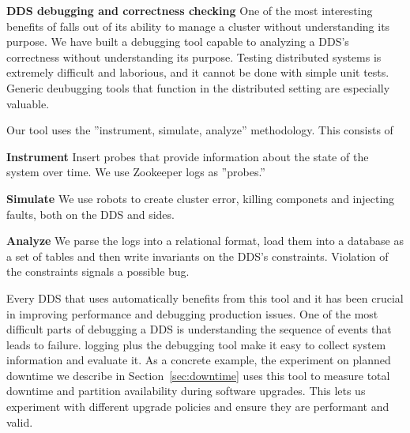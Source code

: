 \textbf{DDS debugging and correctness checking}
%
One of the most interesting benefits of \helix falls out of its ability to
manage a cluster without understanding its purpose.  We have built a debugging
tool capable to analyzing a DDS's correctness without understanding its purpose.
Testing distributed systems is extremely difficult and laborious, and it cannot
be done with simple unit tests.   Generic
deubugging tools that function in the distributed setting are especially valuable.  

Our tool uses the ''instrument,
simulate, analyze'' methodology. This consists of
\squishlist
\item \textbf{Instrument} Insert probes that provide information about the state of the system
over time.  We use Zookeeper logs as ''probes.''
\item \textbf{Simulate} We use robots to create cluster error, killing componets
and injecting faults, both on the DDS and \helix sides.
\item \textbf{Analyze} We parse the logs into a relational format, load them into a database as
a set of tables and then write invariants on the DDS's constraints.  Violation
of the constraints signals a possible bug.
\squishend

Every DDS that uses \helix automatically benefits from this tool and it has been crucial
in improving performance and debugging production issues.  
One of the most difficult parts of debugging a DDS is understanding the sequence
of events that leads to failure.  \helix logging plus the debugging tool make it
easy to collect system information and evaluate it.
As a concrete example, the experiment on
planned downtime we describe in Section~\ref{sec:downtime} uses this tool to
measure total downtime and partition availability during software upgrades.
This lets us experiment with different upgrade policies and ensure they are
performant and valid.


